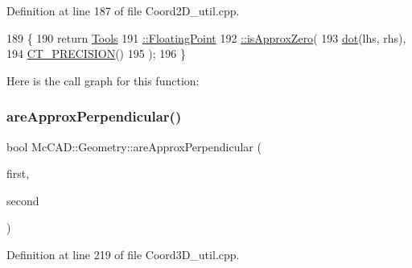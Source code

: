 Definition at line 187 of file Coord2\+D\+\_\+util.\+cpp.


\begin{DoxyCode}
189                            \{
190     \textcolor{keywordflow}{return} \hyperlink{namespaceMcCAD_1_1Tools_1_1FloatingPoint_a92d14d494cb5fb205e46aad76a9a96b7}{Tools}
191 \hyperlink{namespaceMcCAD_1_1Tools_1_1FloatingPoint_a92d14d494cb5fb205e46aad76a9a96b7}{            ::FloatingPoint}
192 \hyperlink{namespaceMcCAD_1_1Tools_1_1FloatingPoint_a92d14d494cb5fb205e46aad76a9a96b7}{            ::isApproxZero}(
193                 \hyperlink{namespaceMcCAD_1_1Geometry_a3115a59f432b3fc11f4bac6ee17d979b}{dot}(lhs, rhs),
194                 \hyperlink{namespaceMcCAD_1_1Geometry_a492f5d9026e8ba8e85f0c81dfb0694ea}{CT\_PRECISION}()
195                 );
196 \}
\end{DoxyCode}
Here is the call graph for this function\+:
\mbox{\label{namespaceMcCAD_1_1Geometry_ace2c1ac6eb161af705b8c6bc357f4e47}} 
\subsubsection{\texorpdfstring{are\+Approx\+Perpendicular()}{areApproxPerpendicular()}\hspace{0.1cm}{\footnotesize\ttfamily [2/2]}}
{\footnotesize\ttfamily bool Mc\+C\+A\+D\+::\+Geometry\+::are\+Approx\+Perpendicular (\begin{DoxyParamCaption}\item[{const \hyperlink{classMcCAD_1_1Geometry_1_1Coord3D}{Coord3D} \&}]{first,  }\item[{const \hyperlink{classMcCAD_1_1Geometry_1_1Coord3D}{Coord3D} \&}]{second }\end{DoxyParamCaption})}



Definition at line 219 of file Coord3\+D\+\_\+util.\+cpp.


